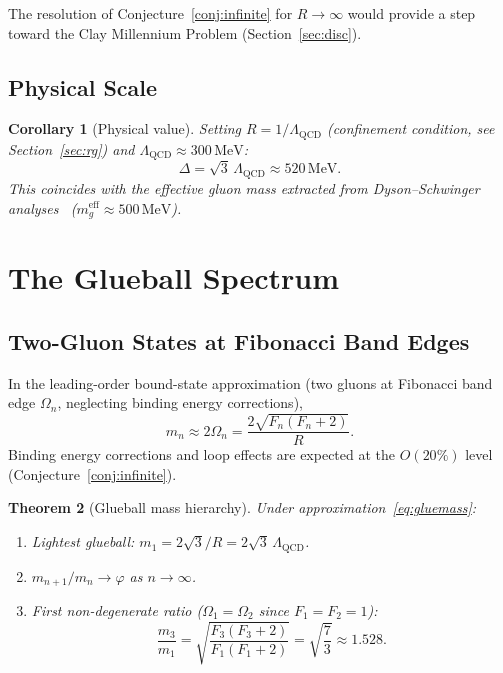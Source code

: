 \documentclass[
  aps,
  prd,
  reprint,
  superscriptaddress,
  nofootinbib,
  longbibliography,
  amsmath,
  amssymb
]{revtex4-2}
\theoremstyle{plain}
\newtheorem{theorem}{Theorem}[section]
\newtheorem{corollary}[theorem]{Corollary}
\theoremstyle{definition}
\theoremstyle{remark}
\newcommand{\vp}{\varphi}
\newcommand{\Lqcd}{\Lambda_{\mathrm{QCD}}}
\begin{document}
The resolution of Conjecture~\ref{conj:infinite} for $R\to\infty$
would provide a step toward the Clay Millennium Problem (Section~\ref{sec:disc}).

\subsection{Physical Scale}

\begin{corollary}[Physical value]
  \label{cor:physgap}
  Setting $R=1/\Lqcd$ (confinement condition, see Section~\ref{sec:rg})
  and $\Lqcd\approx300\,\mathrm{MeV}$:
  \begin{equation}
    \Delta = \sqrt3\,\Lqcd \approx 520\,\mathrm{MeV}.
    \label{eq:physgap}
  \end{equation}
  This coincides with the effective gluon mass extracted from
  Dyson--Schwinger analyses~\cite{Cornwall1982,Aguilar2020}
  ($m_g^{\mathrm{eff}}\approx500\,\mathrm{MeV}$).
\end{corollary}

\section{The Glueball Spectrum}
\label{sec:glueballs}

\subsection{Two-Gluon States at Fibonacci Band Edges}

In the leading-order bound-state approximation (two gluons at
Fibonacci band edge $\Omega_n$, neglecting binding energy corrections),
\begin{equation}
  m_n \approx 2\Omega_n = \frac{2\sqrt{F_n(F_n+2)}}{R}.
  \label{eq:gluemass}
\end{equation}
Binding energy corrections and loop effects are expected at the
$O(20\%)$ level (Conjecture~\ref{conj:infinite}).

\begin{theorem}[Glueball mass hierarchy]
  \label{thm:gbhierarchy}
  Under approximation~\eqref{eq:gluemass}:
  \begin{enumerate}[label=\textup{(\alph*)}]
  \item Lightest glueball: $m_1 = 2\sqrt3/R = 2\sqrt3\,\Lqcd$.
  \item $m_{n+1}/m_n\to\vp$ as $n\to\infty$.
  \item First non-degenerate ratio
    ($\Omega_1=\Omega_2$ since $F_1=F_2=1$):
    \[
      \frac{m_3}{m_1} = \sqrt{\frac{F_3(F_3+2)}{F_1(F_1+2)}} = \sqrt{\frac{7}{3}} \approx 1.528.
    \]
  \end{enumerate}
\end{theorem}
\end{document}
